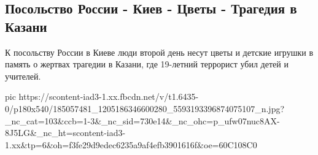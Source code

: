  
 
 
 
 

\subsection{Посольство России - Киев - Цветы - Трагедия в Казани}

К посольству России в Киеве люди второй день несут цветы и детские игрушки в
память о жертвах трагедии в Казани, где 19-летний террорист убил детей и
учителей.


\ifcmt
  pic https://scontent-iad3-1.xx.fbcdn.net/v/t1.6435-0/p180x540/185057481_1205186346600280_5593193396874075107_n.jpg?_nc_cat=103&ccb=1-3&_nc_sid=730e14&_nc_ohc=p_ufw07nuc8AX-8J5LG&_nc_ht=scontent-iad3-1.xx&tp=6&oh=f3fe29d9edec6235a9af4efb3901616f&oe=60C108C0
\fi

